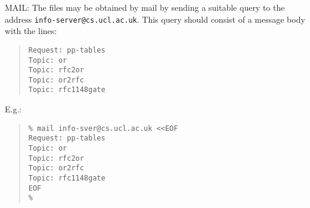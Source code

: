 \begin{describe}
\item[MAIL:] The files may be obtained by mail by sending a suitable
query to the address \verb|info-server@cs.ucl.ac.uk|. This query
should consist of a message body with the lines:
\begin{quote}\small\begin{verbatim}
Request: pp-tables
Topic: or
Topic: rfc2or
Topic: or2rfc
Topic: rfc1148gate
\end{verbatim}\end{quote}
E.g.:
\begin{quote}\small\begin{verbatim}
% mail info-sver@cs.ucl.ac.uk <<EOF
Request: pp-tables
Topic: or
Topic: rfc2or
Topic: or2rfc
Topic: rfc1148gate
EOF
%
\end{verbatim}\end{quote}
\end{describe}
